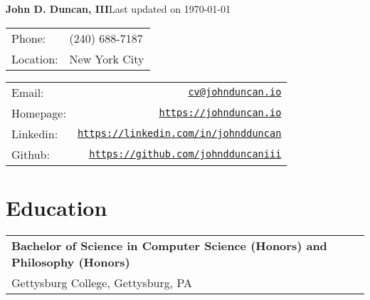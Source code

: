 \documentclass[a4paper]{article}
\makeatletter
\def\name{John D. Duncan, III}
\def\email{cv@johnduncan.io}
\def\webpage{https://johnduncan.io}
\def\linkedin{https://linkedin.com/in/johndduncan}
\def\github{https://github.com/johndduncaniii}
\newcommand{\updateinfo}[1][\today]{{\color{gray}Last updated on #1}}
\makeatother
\begin{document}
{\huge \bfseries \name}\hfill \updateinfo\\

\begin{tabular}{ll}
	Phone: & (240) 688-7187\\
	Location: & New York City \\
\end{tabular}
\hfill
\begin{tabular}{lr}
	Email: & \href{mailto:\email}{\tt \email}\\
	Homepage: & \href{\webpage}{\tt \webpage}\\
	Linkedin: & \href{\linkedin}{\tt \linkedin} \\
	Github: & \href{\github}{\tt \github} \\
\end{tabular}


\section*{Education}

\begin{tabular}{ll}
  \textbf{Bachelor of Science in Computer Science {\footnotesize (Honors)} and Philosophy {\footnotesize (Honors)}} & \\
  Gettysburg College, Gettysburg, PA & \\
\end{tabular}
\end{document}

